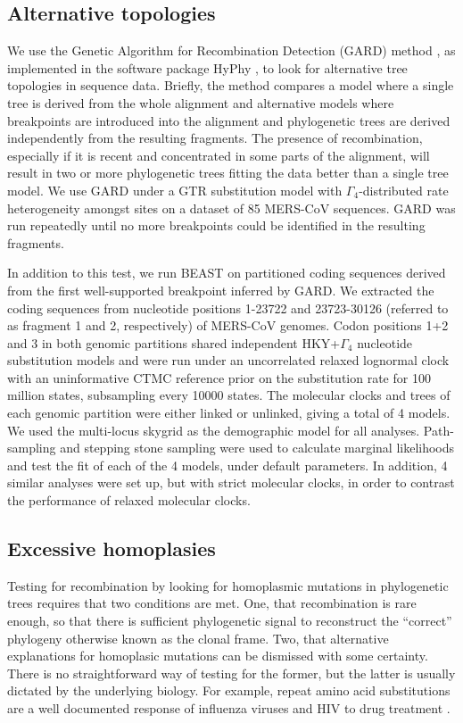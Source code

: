 \documentclass[11pt,oneside,letterpaper]{article}
\begin{document}
\subsection*{Alternative topologies}
We use the Genetic Algorithm for Recombination Detection (GARD) method \citep{pond_2006}, as implemented in the software package HyPhy \citep{pond_2005}, to look for alternative tree topologies in sequence data.
Briefly, the method compares a model where a single tree is derived from the whole alignment and alternative models where breakpoints are introduced into the alignment and phylogenetic trees are derived independently from the resulting fragments.
The presence of recombination, especially if it is recent and concentrated in some parts of the alignment, will result in two or more phylogenetic trees fitting the data better than a single tree model.
We use GARD under a GTR \citep{tavare_1986} substitution model with $\Gamma_{4}$-distributed rate heterogeneity amongst sites \citep{yang_1994} on a dataset of 85 MERS-CoV sequences.
GARD was run repeatedly until no more breakpoints could be identified in the resulting fragments.

In addition to this test, we run BEAST \citep{drummond_2012} on partitioned coding sequences derived from the first well-supported breakpoint inferred by GARD.
We extracted the coding sequences from nucleotide positions 1-23722 and 23723-30126 (referred to as fragment 1 and 2, respectively) of MERS-CoV genomes.
Codon positions 1+2 and 3 in both genomic partitions shared independent HKY+$\Gamma_{4}$ \citep{hky_1985,yang_1994} nucleotide substitution models and were run under an uncorrelated relaxed lognormal clock with an uninformative CTMC reference prior \citep{ferreira_2008} on the substitution rate for 100 million states, subsampling every 10000 states.
The molecular clocks and trees of each genomic partition were either linked or unlinked, giving a total of 4 models.
We used the multi-locus skygrid \citep{gill_2013} as the demographic model for all analyses.
Path-sampling and stepping stone sampling \citep{baele_2012} were used to calculate marginal likelihoods and test the fit of each of the 4 models, under default parameters.
In addition, 4 similar analyses were set up, but with strict molecular clocks, in order to contrast the performance of relaxed molecular clocks.

\subsection*{Excessive homoplasies}
Testing for recombination by looking for homoplasmic mutations in phylogenetic trees requires that two conditions are met.
One, that recombination is rare enough, so that there is sufficient phylogenetic signal to reconstruct the ``correct'' phylogeny otherwise known as the clonal frame.
Two, that alternative explanations for homoplasic mutations can be dismissed with some certainty.
There is no straightforward way of testing for the former, but the latter is usually dictated by the underlying biology.
For example, repeat amino acid substitutions are a well documented response of influenza viruses and HIV to drug treatment \citep{gubareva_2001,tisdale_1993,boucher_1993}.
\end{document}
